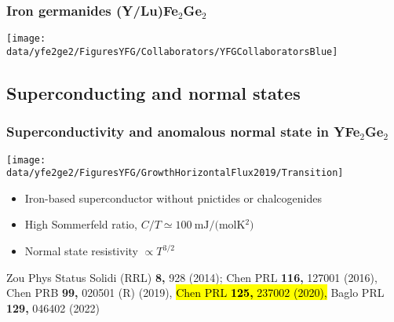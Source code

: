 \begin{frame}[plain,label=YFGCollab]
\frametitle {Iron germanides (Y/Lu)Fe$_2$Ge$_2$}
\vspace{0em}
\texttt{[image: \\data/yfe2ge2/FiguresYFG/Collaborators/YFGCollaboratorsBlue]}

\end{frame}

\subsection{Superconducting and normal states}
\begin{frame}[label=YFGIntro]
\frametitle{Superconductivity and anomalous normal state in YFe$_2$Ge$_2$}

\centerline{\texttt{[image: \\data/yfe2ge2/FiguresYFG/GrowthHorizontalFlux2019/Transition]} }
\begin{itemize}
\item
Iron-based superconductor without pnictides or chalcogenides
\item
High Sommerfeld ratio, $C/T \simeq \SI{100}{\mJ/(\mol\kelvin^2)}$
\item
Normal state resistivity $\propto T^{3/2}$
\end{itemize}

\vspace*{\fill}
\centerline{\makebox[\linewidth]{\rule{0.85\textwidth}{0.4pt}}}
\begin{center}
{\scriptsize Zou Phys Status Solidi (RRL) {\bf 8,} 928
  (2014); Chen PRL {\bf 116,} 127001 (2016), Chen PRB {\bf 99,} 020501 (R) (2019), \hl{Chen PRL {\bf 125,} 237002 (2020), } {Baglo PRL {\bf 129,} 046402 (2022)}}
  \end{center}
\end{frame}


